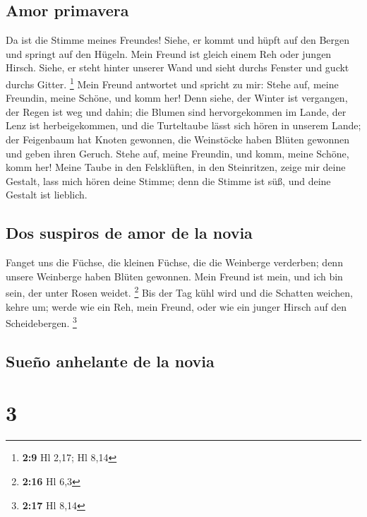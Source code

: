 \hypertarget{amor-primavera}{%
\subsection{Amor primavera}\label{amor-primavera}}

 Da ist die Stimme meines Freundes! Siehe, er kommt und
hüpft auf den Bergen und springt auf den Hügeln.  Mein
Freund ist gleich einem Reh oder jungen Hirsch. Siehe, er steht hinter
unserer Wand und sieht durchs Fenster und guckt durchs Gitter.
\footnote{\textbf{2:9} Hl 2,17; Hl 8,14}  Mein Freund
antwortet und spricht zu mir: Stehe auf, meine Freundin, meine Schöne,
und komm her!  Denn siehe, der Winter ist vergangen, der
Regen ist weg und dahin;  die Blumen sind hervorgekommen
im Lande, der Lenz ist herbeigekommen, und die Turteltaube lässt sich
hören in unserem Lande;  der Feigenbaum hat Knoten
gewonnen, die Weinstöcke haben Blüten gewonnen und geben ihren Geruch.
Stehe auf, meine Freundin, und komm, meine Schöne, komm her!
 Meine Taube in den Felsklüften, in den Steinritzen,
zeige mir deine Gestalt, lass mich hören deine Stimme; denn die Stimme
ist süß, und deine Gestalt ist lieblich.

\hypertarget{dos-suspiros-de-amor-de-la-novia}{%
\subsection{Dos suspiros de amor de la
novia}\label{dos-suspiros-de-amor-de-la-novia}}

 Fanget uns die Füchse, die kleinen Füchse, die die
Weinberge verderben; denn unsere Weinberge haben Blüten gewonnen.
 Mein Freund ist mein, und ich bin sein, der unter Rosen
weidet. \footnote{\textbf{2:16} Hl 6,3}  Bis der Tag kühl
wird und die Schatten weichen, kehre um; werde wie ein Reh, mein Freund,
oder wie ein junger Hirsch auf den Scheidebergen. \footnote{\textbf{2:17}
  Hl 8,14}

\hypertarget{sueuxf1o-anhelante-de-la-novia}{%
\subsection{Sueño anhelante de la
novia}\label{sueuxf1o-anhelante-de-la-novia}}

\hypertarget{section-2}{%
\section{3}\label{section-2}}

